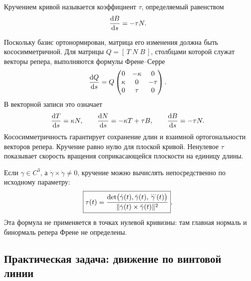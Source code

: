 \begin{definition}
Кручением кривой называется коэффициент \(\tau\), определяемый равенством
\begin{equation}
\label{eq:torsion-definition}
\frac{\mathop{}\!\mathrm{d} B}{\mathop{}\!\mathrm{d} s}=-\tau N.
\end{equation}
\end{definition}

Поскольку базис ортонормирован, матрица его изменения должна быть кососимметричной. Для матрицы \(Q=[\,T\;N\;B\,]\), столбцами которой служат векторы репера, выполняются формулы Френе--Серре
\begin{equation}
\label{eq:frenet-serret}
\frac{\mathop{}\!\mathrm{d} Q}{\mathop{}\!\mathrm{d} s}
=
Q
\begin{pmatrix}
0 & -\kappa & 0\\
\kappa & 0 & -\tau\\
0 & \tau & 0
\end{pmatrix}.
\end{equation}
В векторной записи это означает
\[
\frac{\mathop{}\!\mathrm{d} T}{\mathop{}\!\mathrm{d} s}=\kappa N,
\qquad
\frac{\mathop{}\!\mathrm{d} N}{\mathop{}\!\mathrm{d} s}=-\kappa T+\tau B,
\qquad
\frac{\mathop{}\!\mathrm{d} B}{\mathop{}\!\mathrm{d} s}=-\tau N.
\]
Кососимметричность гарантирует сохранение длин и взаимной ортогональности векторов репера. Кручение равно нулю для плоской кривой. Ненулевое \(\tau\) показывает скорость вращения соприкасающейся плоскости на единицу длины.

Если \(\gamma\in C^3\), а \(\dot\gamma\times\ddot\gamma\neq0\), кручение можно вычислять непосредственно по исходному параметру:
\begin{equation}
\label{eq:torsion-arbitrary-parameter}
\boxed{
\tau(t)
=
\frac{
\det\bigl(\dot\gamma(t),\ddot\gamma(t),\dddot\gamma(t)\bigr)
}{
\lVert\dot\gamma(t)\times\ddot\gamma(t)\rVert^2
}
}.
\end{equation}
Эта формула не применяется в точках нулевой кривизны: там главная нормаль и бинормаль репера Френе не определены.

\subsection{Практическая задача: движение по винтовой линии}

